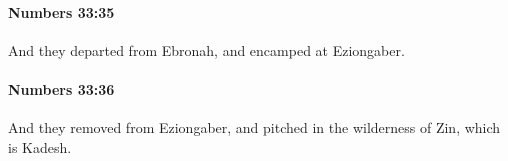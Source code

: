 		\paragraph{Numbers 33:35} %
			\label{NUMBERS-33-35}

			And they departed from Ebronah, and encamped at Eziongaber.


		\paragraph{Numbers 33:36} %
			\label{NUMBERS-33-36}

			And they removed from Eziongaber, and pitched in the wilderness of Zin, which is Kadesh.



